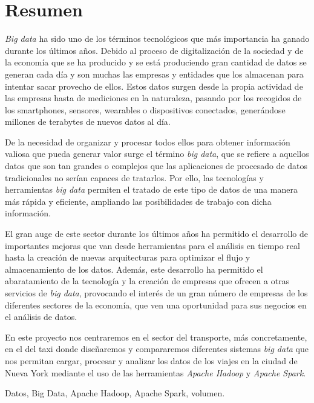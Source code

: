 \chapter*{Resumen}

\begin{abstractEs}
\textit{Big data} ha sido uno de los términos tecnológicos que más importancia ha ganado durante los últimos años. Debido al proceso de digitalización de la sociedad y de la economía que se ha producido y se está produciendo gran cantidad de datos se generan cada día y son muchas las empresas y entidades que los almacenan para intentar sacar provecho de ellos. Estos datos surgen desde la propia actividad de las empresas hasta de mediciones en la naturaleza, pasando por los recogidos de los smartphones, sensores, wearables o dispositivos conectados, generándose millones de terabytes de nuevos datos al día.

De la necesidad de organizar y procesar todos ellos para obtener información valiosa que pueda generar valor surge el término \textit{big data}, que se refiere a aquellos datos que son tan grandes o complejos que las aplicaciones de procesado de datos tradicionales no serían capaces de tratarlos. Por ello, las tecnologías y herramientas \textit{big data} permiten el tratado de este tipo de datos de una manera más rápida y eficiente, ampliando las posibilidades de trabajo con dicha información.

El gran auge de este sector durante los últimos años ha permitido el desarrollo de importantes mejoras que van desde herramientas para el análisis en tiempo real hasta la creación de nuevas arquitecturas para optimizar el flujo y almacenamiento de los datos. Además, este desarrollo ha permitido el abaratamiento de la tecnología y la creación de empresas que ofrecen a otras servicios de \textit{big data}, provocando el interés de un gran número de empresas de los diferentes sectores de la economía, que ven una oportunidad para sus negocios en el análisis de datos.

En este proyecto nos centraremos en el sector del transporte, más concretamente, en el del taxi donde diseñaremos y compararemos diferentes sistemas \textit{big data} que nos permitan cargar, procesar y analizar los datos de los viajes en la ciudad de Nueva York mediante el uso de las herramientas \textit{Apache Hadoop} y \textit{Apache Spark}.

\end{abstractEs}

\begin{keywordsEs}
Datos, Big Data, Apache Hadoop, Apache Spark, volumen.
\end{keywordsEs}

